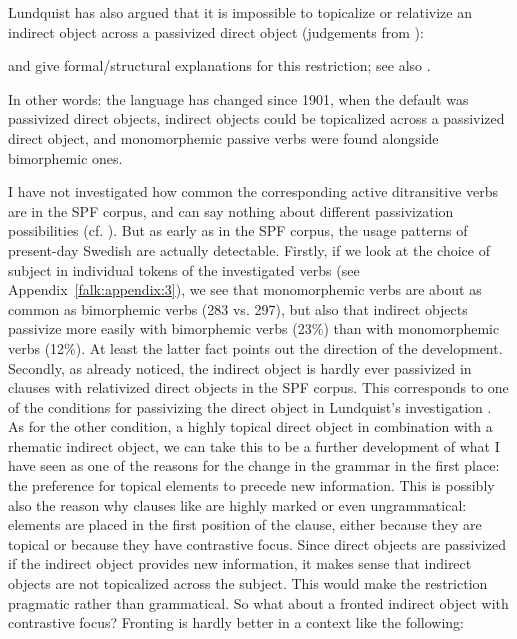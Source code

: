 \documentclass[output=paper]{langscibook}
\begin{document}
Lundquist has also argued that it is impossible to topicalize or relativize an indirect object across a passivized direct object (judgements from \citealt{Lundquist2004}):


\ea%
    \label{ex:falk:27}
\z
\z

\citet{HolmbergEtAl2019} and \citet{Platzack2006} give formal/structural explanations for this restriction; see also \citet{Lundquist2015}. 


In other words: the language has changed since 1901, when the default was passivized direct objects, indirect objects could be topicalized across a passivized direct object, and monomorphemic passive verbs were found alongside bimorphemic ones.



I have not investigated how common the corresponding active ditransitive verbs are in the SPF corpus, and can say nothing about different passivization possibilities (cf. \citealt{HaddicanHolmberg2019}). But as early as in the SPF corpus, the usage patterns of present-day Swedish are actually detectable. Firstly, if we look at the choice of subject in individual tokens of the investigated verbs (see Appendix~\ref{falk:appendix:3}), we see that monomorphemic verbs are about as common as bimorphemic verbs (283 vs. 297), but also that indirect objects passivize more easily with bimorphemic verbs (23\%) than with monomorphemic verbs (12\%). At least the latter fact points out the direction of the development. Secondly, as already noticed, the indirect object is hardly ever passivized in clauses with relativized direct objects in the SPF corpus. This corresponds to one of the conditions for passivizing the direct object in Lundquist’s investigation \parencite{Lundquist2004}. As for the other condition, a highly topical direct object in combination with a rhematic indirect object, we can take this to be a further development of what I have seen as one of the reasons for the change in the grammar in the first place: the preference for topical elements to precede new information. This is possibly also the reason why clauses like  are highly marked or even ungrammatical: elements are placed in the first position of the clause, either because they are topical or because they have contrastive focus. Since direct objects are passivized if the indirect object provides new information, it makes sense that indirect objects are not topicalized across the subject. This would make the restriction pragmatic rather than grammatical. So what about a fronted indirect object with contrastive focus? Fronting is hardly better in a context like the following:
\end{document}
